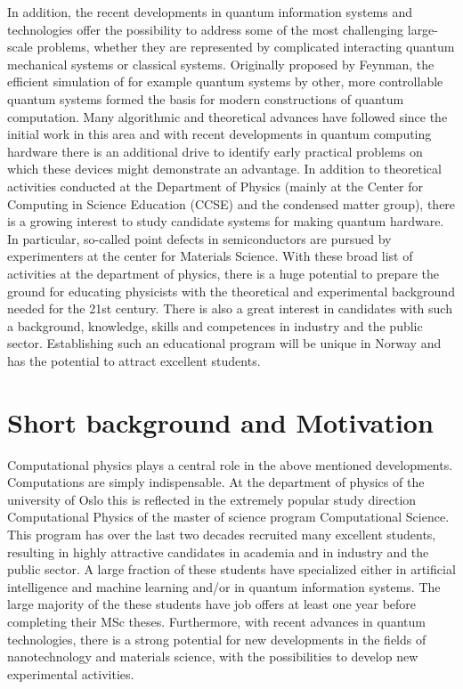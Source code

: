 \documentclass[aps,rmp,preprint,amsmath,amssymb,graphicx,longbibliography]{revtex4-1}
\begin{document}
In addition, the recent developments in quantum information systems and technologies offer the possibility to address some of the most challenging large-scale problems, whether they are represented by complicated interacting quantum mechanical systems or classical systems.
Originally proposed by Feynman, the efficient
simulation of for example quantum systems by other, more controllable quantum
systems formed the basis for modern constructions of quantum
computation.  
Many algorithmic and theoretical advances have followed since the
initial work in this area and with recent developments in quantum computing
hardware there is an additional drive to identify early practical problems on
which these devices might demonstrate an advantage. In addition to theoretical activities conducted at the Department of Physics (mainly at the Center for Computing in Science Education (CCSE) and the condensed matter group), there is a growing interest to study candidate systems for making quantum hardware. In particular, so-called point defects in semiconductors are pursued by experimenters at the center for Materials Science. 
With these broad list of activities at the department of physics, there is a huge potential to prepare the ground for educating physicists with the theoretical and experimental background needed for the 21st century. There is also a great interest in candidates with such a background, knowledge, skills and competences in industry and the public sector.
Establishing such an educational program will be unique in Norway and has the potential to attract excellent students.  



\section{Short background and Motivation}

Computational physics plays a central role in the above mentioned   developments. 
Computations are simply indispensable. 
At the department of physics of the university of Oslo this is reflected in the extremely popular study direction Computational Physics of the master of science program Computational Science. This program has over the last two decades recruited many excellent students, resulting in highly attractive candidates in academia and in industry  and the public sector. A large fraction of these students have specialized either in artificial intelligence and machine learning and/or in quantum information systems.  The large  majority of the these students have job offers at least one year before completing their MSc theses. Furthermore, with recent advances in quantum technologies, there is a strong potential for new developments in the fields of nanotechnology and materials science, with the possibilities to develop new experimental activities. 
\end{document}
